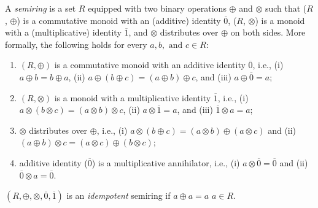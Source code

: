 \documentclass[a4paper,UKenglish,cleveref, autoref, thm-restate, anonymous]{lipics-v2021}
\begin{document}
A \emph{semiring} is a set $R$ equipped with two binary operations $\oplus$ and
$\otimes$ such that ($R$, $\oplus$) is a commutative monoid with 
an (additive) identity $\overline{0}$, ($R$, $\otimes$) 
is a monoid with a (multiplicative) identity $\overline{1}$, and 
$\otimes$ distributes over  
$\oplus$ on both sides. More formally, the following holds for every $a, b, \text{ and } c \in R$: 
\begin{enumerate}

    \item $(R, \oplus)$ is a commutative monoid with an additive identity $\overline{0}$, i.e.,
(i) $a \oplus b = b \oplus a$, (ii) $a \oplus (b \oplus c) = (a \oplus b) \oplus c$, and (iii) 
$a \oplus \overline{0} = a$;
    \item $(R, \otimes)$ is a monoid with a multiplicative identity 
$\overline{1}$, i.e., (i) $a \otimes (b \otimes c) = (a \otimes b) \otimes c$, (ii) 
$a \otimes \overline{1} = a$, and (iii) $\overline{1} \otimes a = a$;
     \item $\otimes$ distributes over $\oplus$, i.e., 
(i) $a \otimes (b \oplus c) = (a \otimes b) \oplus (a \otimes c)$  and 
(ii) $(a \oplus b) \otimes c = (a \otimes c) \oplus (b \otimes c)$; 
\item additive identity ($\overline{0}$) is a multiplicative annihilator, 
i.e., (i) $a \otimes \overline{0} = \overline{0}$ and (ii)
$\overline{0} \otimes a = \overline{0}$.
\end{enumerate}

\begin{definition}\label{idemdef}
\((R, \oplus, \otimes, \overline{0}, \overline{1})\) is an \textit{idempotent} semiring if 
$a \oplus a = a$  $a \in R$. 
\end{definition}
\end{document}
